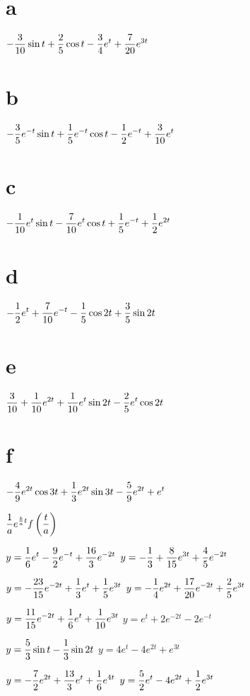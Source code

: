 \;
 \part{a} $\displaystyle{-\frac{3}{10}\sin t+\frac{2}{5}\cos t-
\frac{3}{4}e^t+\frac{7}{20}e^{3t}}$\;
\part{b} $\displaystyle{-\frac{3}{5}e^{-t}\sin t+\frac{1}{5}
e^{-t}\cos t-\frac{1}{2}e^{-t}+\frac{3}{10}e^{t}}$\;
\part{c} $\displaystyle{-\frac{1}{10}e^t\sin t-\frac{7}{10}e^t
\cos t+\frac{1}{5} e^{-t}+\frac{1}{2}e^{2t}}$\;
\part{d} $\displaystyle{-\frac{1}{2}e^t+\frac{7}{10}e^{-t}-\frac{1}{5}\cos 2t+\frac{3}{5}\sin 2t}$
\part{e} $\displaystyle{\frac{3}{10}+\frac{1}{10}e^{2t}+\frac{1}{10}e^t\sin
2t-\frac{2}{5}e^t\cos 2t}$\;
\part{f} $\displaystyle{-\frac{4}{9}e^{2t}\cos 3t+\frac{1}{3}
e^{2t}\sin 3t-\frac{5}{9} e^{2t}+e^t}$

 $\displaystyle{\frac{1}{a}e^{\frac{b}{a}t}f\left(\frac{t}{a}\right)}$



 $y=\displaystyle{\frac{1}{6}e^t-\frac{9}{2}e^{-t}+\frac{16}{3}e^{-2t}}$
  $y=\displaystyle{-\frac{1}{3}+\frac{8}{15}e^{3t}+\frac{4}{5}e^{-2t}}$

  $y=\displaystyle{-\frac{23}{15}e^{-2t}+\frac{1}{3}e^t
+\frac{1}{5}e^{3t}}$
  $y=\displaystyle{-\frac{1}{4}e^{2t}+\frac{17}{20}e^{-2t}+\frac{2}{5}e^{3t}}$

  $y=\displaystyle{\frac{11}{15}e^{-2t}+\frac{1}{6}e^t+\frac{1}{10}e^{3t}}$
  $y=e^t+2e^{-2t}-2e^{-t}$

  $y=\displaystyle{\frac{5}{3}\sin t-\frac{1}{3}\sin2t}$
  $y=4e^t-4e^{2t}+e^{3t}$

  $y=\displaystyle{-\frac{7}{2}e^{2t}+\frac{13}{3}e^t+\frac{1}{6}e^{4t}}$
  $y=\displaystyle{\frac{5}{2}e^t-4e^{2t}+\frac{1}{2}e^{3t}}$

